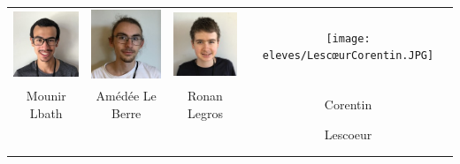 \vfill
\pagebreak

\begin{center}
\begin{tabular}{cccc}
\includegraphics[angle=270,origin=c, width=27mm]{eleves/Lbath Mounir.JPG} &
\includegraphics[angle=270,origin=c, width=27mm]{eleves/Le Berre Amédée.JPG} &
\includegraphics[angle=270,origin=c, width=27mm]{eleves/Legros Ronan.JPG} &
\texttt{[image: eleves/LescœurCorentin.JPG]} \\
Mounir Lbath & Amédée Le Berre & Ronan Legros & Corentin \\ & & & Lescoeur \\ \\ \\ 


\end{tabular}
\end{center}
